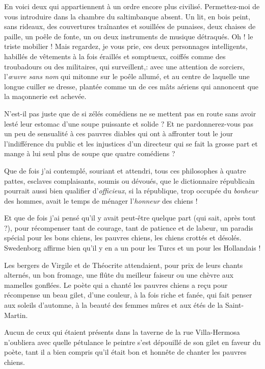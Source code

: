 En voici deux qui appartiennent à un ordre encore plus civilisé.
Permettez{}-moi de vous introduire dans la chambre du saltimbanque
absent. Un lit, en bois peint, sans rideaux, des couvertures traînantes
et souillées de punaises, deux chaises de paille, un poêle de fonte, un
ou deux instruments de musique détraqués. Oh ! le triste mobilier !
Mais regardez, je vous prie, ces deux personnages intelligents,
habillés de vêtements à la fois éraillés et somptueux, coiffés comme
des troubadours ou des militaires, qui surveillent,: avec une attention
de sorciers, l’\textit{\oe uvre sans nom} qui mitonne sur le
poêle allumé, et au centre de laquelle une longue cuiller se dresse,
plantée comme un de ces mâts aériens qui annoncent que la maçonnerie
est achevée. 

N’est{}-il pas juste que de si zélés comédiens ne se
mettent pas en route sans avoir lesté leur estomac
d’une soupe puissante et solide ? Et ne
pardonnerez{}-vous pas un peu de sensualité à ces pauvres diables qui
ont à affronter tout le jour l’indifférence du public
et les injustices d’un directeur qui se fait la grosse
part et mange à lui seul plus de soupe que quatre comédiens ?

Que de fois j’ai contemplé, souriant et attendri, tous
ces philosophes à quatre pattes, esclaves complaisants, soumis ou
dévoués, que le dictionnaire républicain pourrait aussi bien qualifier
d’\textit{officieux}, si la république, trop occupée du \textit{bonheur}
des hommes, avait le temps de ménager l’\textit{honneur} des
chiens !

Et que de fois j’ai pensé qu’il y
avait peut{}-être quelque part (qui sait, après tout ?), pour
récompenser tant de courage, tant de patience et de labeur, un paradis
spécial pour les bons chiens, les pauvres chiens, les chiens crottés et
désolés. Swedenborg affirme bien qu’il y en a un pour
les Turcs et un pour les Hollandais !

Les bergers de Virgile et de Théocrite attendaient, pour prix de leurs
chants alternés, un bon fromage, une flûte du meilleur faiseur ou une
chèvre aux mamelles gonflées. Le poète qui a chanté les pauvres chiens
a reçu pour récompense un beau gilet, d’une couleur, à
la fois riche et fanée, qui fait penser aux soleils
d’automne, à la beauté des femmes mûres et aux étés de
la Saint{}-Martin.

Aucun de ceux qui étaient présents dans la taverne de la rue
Villa{}-Hermosa n’oubliera avec quelle pétulance le
peintre s’est dépouillé de son gilet en faveur du
poète, tant il a bien compris qu’il était bon et
honnête de chanter les pauvres chiens.

